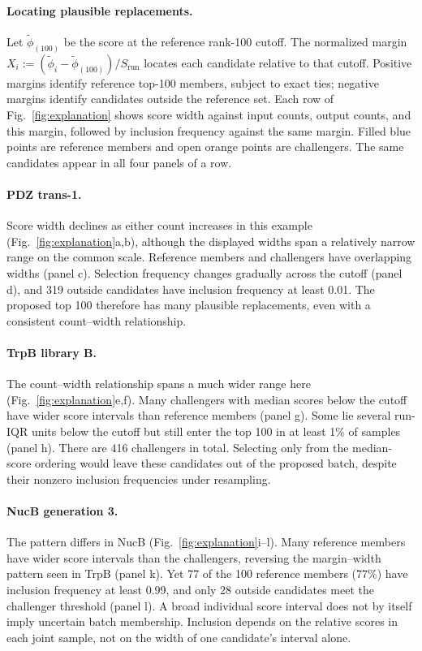 \documentclass[11pt]{article}
\newcommand{\fit}{\phi}
\begin{document}
\paragraph{Locating plausible replacements.}
Let $\widetilde\fit_{(100)}$ be the score at the reference rank-100 cutoff.
The normalized margin
$X_i:=(\widetilde\fit_i-\widetilde\fit_{(100)})/S_{\mathrm{run}}$
locates each candidate relative to that cutoff.
Positive margins identify reference top-100 members, subject to exact ties;
negative margins identify candidates outside the reference set. Each row
of Fig.~\ref{fig:explanation} shows score width against input counts, output
counts, and this margin, followed by inclusion frequency against the same
margin. Filled blue points are reference members and open orange points
are challengers. The same candidates appear in all four panels of a row.

\paragraph{PDZ trans-1.}
Score width declines as either count increases in this example
(Fig.~\ref{fig:explanation}a,b), although the displayed widths span a
relatively narrow range on the common scale. Reference members and
challengers have overlapping widths (panel c). Selection frequency changes
gradually across the cutoff (panel d), and 319 outside candidates have
inclusion frequency at least 0.01. The proposed top 100 therefore has many
plausible replacements, even with a consistent count--width relationship.

\paragraph{TrpB library B.}
The count--width relationship spans a much wider range here
(Fig.~\ref{fig:explanation}e,f). Many challengers with median scores below
the cutoff have wider score intervals than reference members (panel g).
Some lie several run-IQR units below the cutoff but still enter the
top 100 in at least 1\% of samples (panel h). There are 416 challengers
in total. Selecting only from the median-score ordering would leave these
candidates out of the proposed batch, despite their nonzero inclusion
frequencies under resampling.

\paragraph{NucB generation 3.}
The pattern differs in NucB (Fig.~\ref{fig:explanation}i--l). Many reference
members have wider score intervals than the challengers, reversing the
margin--width pattern seen in TrpB (panel k). Yet 77 of the 100 reference
members (77\%) have inclusion frequency at least 0.99, and only 28 outside
candidates meet the challenger threshold (panel l). A broad individual
score interval does not by itself imply uncertain batch membership.
Inclusion depends on the relative scores in each joint sample, not on
the width of one candidate's interval alone.
\end{document}
